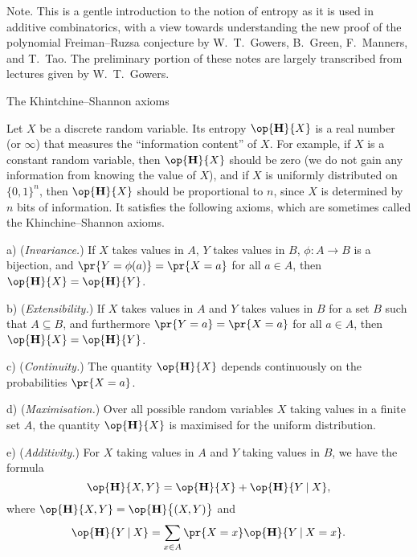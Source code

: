 


\def\eps{\epsilon}
\def\FF{{\bf F}}
\def\bar#1{\overline{#1}}
\def\hat#1{\widehat{#1}}
\def\norm#1{|\!|#1|\!|}
\def\bignorm#1{\big|\!\big|#1\big|\!\big|}
\def\Norm#1{\Big|\!\Big|#1\Big|\!\Big|}
\def\normm#1{\bigg|\!\bigg|#1\bigg|\!\bigg|}
\def\Bohr{\op{\rm Bohr}}
\def\Eta{\op{\bf H}}
\def\II{\op{\bf I}}
\def\given{\mathbin{|}}

\widemargins
{}


 \ninebf Note.
\ninepoint This is a gentle introduction to the notion of entropy as it is used
in additive combinatorics, with a view towards understanding the new proof of the polynomial Freiman--Ruzsa
conjecture by W.~T.~Gowers, B.~Green, F.~Manners, and T.~Tao. The preliminary portion of
these notes are largely transcribed from lectures given by W.~T.~Gowers.

\bigskip

\advsect The Khintchine--Shannon axioms

Let $X$ be a discrete random variable. Its entropy $\Eta\{X\}$ is a real number
(or $\infty$) that measures the ``information content'' of $X$. For example, if $X$ is
a constant random variable, then $\Eta\{X\}$ should be zero (we do not gain any information
from knowing the value of $X$), and if $X$ is
uniformly distributed on $\{0,1\}^n$, then $\Eta\{X\}$ should be proportional to $n$, since $X$ is
determined by
$n$ bits of information. It satisfies the following axioms, which are
sometimes called the Khinchine--Shannon axioms.
\medskip
\item{a)} ({\it Invariance.}) If $X$ takes values in $A$, $Y$ takes values in $B$,
$\phi:A\to B$ is a bijection, and $\pr\{Y = \phi(a)\} = \pr\{X = a\}$ for all $a\in A$,
then $\Eta\{X\} = \Eta\{Y\}$.
\smallskip
\item{b)} ({\it Extensibility.}) If $X$ takes values in $A$ and $Y$ takes values in $B$ for
a set $B$ such that $A\subseteq B$, and furthermore $\pr\{Y=a\} = \pr\{X=a\}$ for all $a\in A$,
then $\Eta\{X\} = \Eta\{Y\}$.
\smallskip
\item{c)} ({\it Continuity.}) The quantity $\Eta\{X\}$ depends continuously on the probabilities
$\pr\{X=a\}$.
\smallskip
\item{d)} ({\it Maximisation.}) Over all possible random variables $X$ taking values in a finite
set $A$, the quantity $\Eta\{X\}$ is maximised for the uniform distribution.
\smallskip
\item{e)} ({\it Additivity.})
For $X$ taking values in $A$ and $Y$ taking values in $B$, we have the formula
$$ \Eta\{X,Y\} = \Eta\{X\} + \Eta\{ Y \given X\},$$
where $\Eta\{X,Y\} = \Eta\bigl\{ (X,Y)\bigr\}$ and
$$ \Eta\{Y\given X\} = \sum_{x\in A} \pr\{X=x\} \Eta\{ Y\given X = x\}.$$
\medskip

